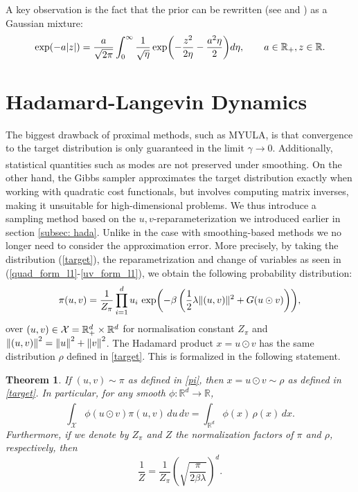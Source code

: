 \documentclass[11pt, twoside]{report}
\newtheorem{theorem}{Theorem}[section]
\begin{document}

A key observation is
 the fact that the prior can be rewritten (see \cite{west1987scale} and \cite{gneiting1997normal}) as a Gaussian mixture:
\begin{equation}\label{eq:laplace}
   \exp\pa{-a\abs{z}} = \frac{a}{ \sqrt{2\pi}}\int_0^\infty \frac{1}{\sqrt{\eta}} \exp\pa{ -\frac{z^2}{2 \eta} - \frac{a^2 \eta}{2}} d\eta, \qquad a\in \real_+,z\in\real.
\end{equation}
\section{Hadamard-Langevin Dynamics}
The biggest drawback of proximal methods, such as MYULA, is that convergence to the target distribution is only guaranteed in the limit $\gamma \xrightarrow[]{} 0$. Additionally, statistical quantities such as modes are not preserved under smoothing. On the other hand, the Gibbs sampler approximates the target distribution exactly when working with quadratic cost functionals, but involves computing matrix inverses, making it unsuitable for high-dimensional problems. We thus introduce a sampling method based on the $u,v$-reparameterization we introduced earlier in section \ref{subsec: hada}. Unlike in the case with smoothing-based methods we no longer need to consider the approximation error. More precisely, by taking the distribution (\ref{target}), the reparametrization and change of variables as seen in (\ref{quad_form_l1}-\ref{uv_form_l1}), we obtain the following probability distribution:
\begin{align}
\pi(u,v)=\frac{1}{Z_\pi} \prod_{i=1}^d  u_i\, \exp\pp{-\beta\, \pp{\frac12\lambda \|(u,v)\|^2+G(u\odot v)} },\label{pi}
\end{align}
over $(u,v)\in \mathcal X= \mathbb{R}_+^d\times \mathbb {R}^d$ for normalisation constant $Z_\pi$ and $\left\lVert(u,v)\right\rVert^2=\left\lVert u\right\rVert^2+\left\lVert v\right\rVert^2$. The Hadamard  product $x=u\odot v$ has the same distribution $\rho$ defined in \ref{target}. This is formalized in the following statement.





\begin{theorem}\label{thm:overparam}If $(u,v)\sim \pi$ as defined in \ref{pi}, then $x=u \odot v\sim\rho$ as defined in \ref{target}. In particular, for any smooth $\phi:\mathbb{R}^d \xrightarrow[]{} \mathbb{R}$,
    \[\int_{\mathcal X} \phi(u \odot v) \pi(u,v)\,du\,dv = \int_{\mathbb{R}^
    d} \phi(x) \,\rho(x)\,dx.\]
    Furthermore, if we denote by $Z_\pi$ and $Z$ the normalization factors of $\pi$ and $\rho$, respectively, then
    \[\frac{1}{Z} = \frac{1}{Z_\pi} \left(\sqrt{\frac{\pi}{2\beta \lambda}}\right)^d.\]
\end{theorem}
\end{document}
